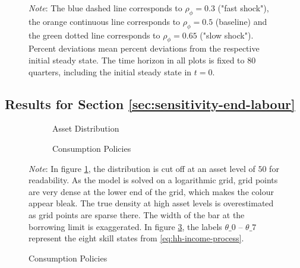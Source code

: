 \documentclass[a4paper,12pt]{article} %
\numberwithin{equation}{section} %
\numberwithin{figure}{section}
\numberwithin{table}{section}
\begin{document}
\begin{refsection}
\begin{appendices}
\begin{figure}[H]
     \vspace{10pt}

     \begin{minipage}{\textwidth} 
    \footnotesize
    \textit{Note}: The blue dashed line corresponds to $\rho_{\phi} = 0.3$ ("fast shock"), the orange continuous line corresponds to $\rho_{\phi} = 0.5$ (baseline) and the green dotted line corresponds to $\rho_{\phi} = 0.65$ ("slow shock"). Percent deviations mean percent deviations from the respective initial steady state. The time horizon in all plots is fixed to $80$ quarters, including the initial steady state in $t=0$.
    \end{minipage}
\end{figure}

\subsection{Results for Section \ref{sec:sensitivity-end-labour}}
\label{sec-app:figures-end-L}

\begin{figure}[H]
    \caption{Endogenous Labour Model -- The Initial Steady State}
    \label{fig:init-stst-end-L}
    \centering
    \begin{subfigure}[b]{0.49\textwidth}
    \caption{Asset Distribution}
    \label{fig:init-stst-end-L-dist}
         \centering
         
     \end{subfigure}
     \hfill
     \begin{subfigure}[b]{0.49\textwidth}
     \caption{Consumption Policies}
     \label{fig:init-stst-end-L-pol-c}
         \centering
         
     \end{subfigure}

    \vspace{10pt}
     
     \justifying
     \footnotesize
	\textit{Note}: In figure \ref{fig:init-stst-end-L-dist}, the distribution is cut off at an asset level of $50$ for readability. As the model is solved on a logarithmic grid, grid points are very dense at the lower end of the grid, which makes the colour appear bleak. The true density at high asset levels is overestimated as grid points are sparse there. The width of the bar at the borrowing limit is exaggerated. In figure \ref{fig:init-stst-end-L-pol-c}, the labels $\theta\_0$ -- $\theta\_7$ represent the eight skill states from \eqref{eq:hh-income-process}.
\end{figure}


\end{appendices}
\end{refsection}
\end{document}
